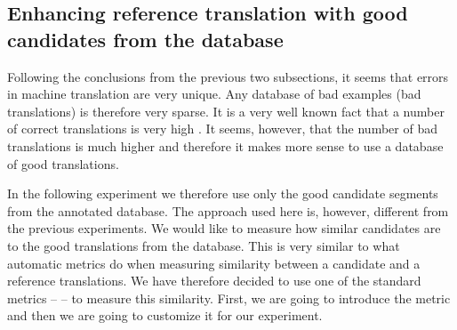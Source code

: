 \subsection{Enhancing reference translation with good candidates from the database}
\label{enhancing:bleu}

Following the conclusions from the previous two subsections, it seems that
errors in machine translation are very unique. Any database of bad examples
(bad translations) is therefore very sparse. It is a very well known fact that a
number of correct translations is very high . It
seems, however, that the number of bad translations is much higher and
therefore it makes more sense to use a database of good translations. 

In the following experiment we therefore use only the good candidate segments
from the annotated database. The approach used here is, however, different from
the previous experiments. We would like to measure how similar candidates are
to the good translations from the database. This is very similar to what
automatic metrics do when measuring similarity between a candidate and a
reference translations. We have therefore decided to use one of the standard
metrics --  -- to measure this similarity. First, we are going to
introduce the metric and then we are going to customize it for our experiment. 

